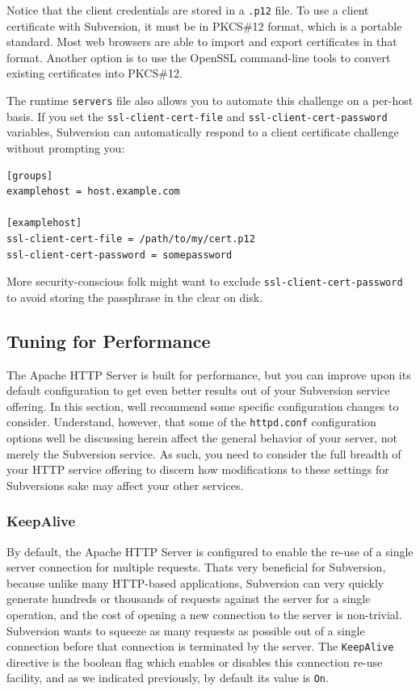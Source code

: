 Notice that the client credentials are stored in a \texttt{.p12} file.
To use a client certificate with Subversion, it must be in PKCS\#12
format, which is a portable standard. Most web browsers are able to
import and export certificates in that format. Another option is to use
the OpenSSL command-line tools to convert existing certificates into
PKCS\#12.

The runtime \texttt{servers} file also allows you to automate this
challenge on a per-host basis. If you set the
\texttt{ssl-client-cert-file} and \texttt{ssl-client-cert-password}
variables, Subversion can automatically respond to a client certificate
challenge without prompting you:

\begin{verbatim}
[groups]
examplehost = host.example.com

[examplehost]
ssl-client-cert-file = /path/to/my/cert.p12
ssl-client-cert-password = somepassword
\end{verbatim}

More security-conscious folk might want to exclude
\texttt{ssl-client-cert-password} to avoid storing the passphrase in the
clear on disk.

\subsection{Tuning for Performance}\label{svn.serverconfig.httpd.perf}

The Apache HTTP Server is built for performance, but you can improve
upon its default configuration to get even better results out of your
Subversion service offering. In this section, we\textquotesingle ll
recommend some specific configuration changes to consider. Understand,
however, that some of the \texttt{httpd.conf} configuration options
we\textquotesingle ll be discussing herein affect the general behavior
of your server, not merely the Subversion service. As such, you need to
consider the full breadth of your HTTP service offering to discern how
modifications to these settings for Subversion\textquotesingle s sake
may affect your other services.

\subsubsection{KeepAlive}\label{svn.serverconfig.httpd.perf.keepalive}

By default, the Apache HTTP Server is configured to enable the re-use of
a single server connection for multiple requests. That\textquotesingle s
very beneficial for Subversion, because unlike many HTTP-based
applications, Subversion can very quickly generate hundreds or thousands
of requests against the server for a single operation, and the cost of
opening a new connection to the server is non-trivial. Subversion wants
to squeeze as many requests as possible out of a single connection
before that connection is terminated by the server. The
\texttt{KeepAlive} directive is the boolean flag which enables or
disables this connection re-use facility, and as we indicated
previously, by default its value is \texttt{On}.

